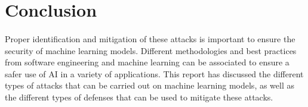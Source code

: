 \documentclass[11pt]{article}
\begin{document}
\section{Conclusion}
\label{sec:conclusion}
\paragraph{}{
    Proper identification and mitigation of these attacks is important to ensure the security of machine learning models. Different methodologies and best practices from software engineering and machine learning can be associated to ensure a safer use of AI in a variety of applications. This report has discussed the different types of attacks that can be carried out on machine learning models, as well as the different types of defenses that can be used to mitigate these attacks. 
}
\end{document}

